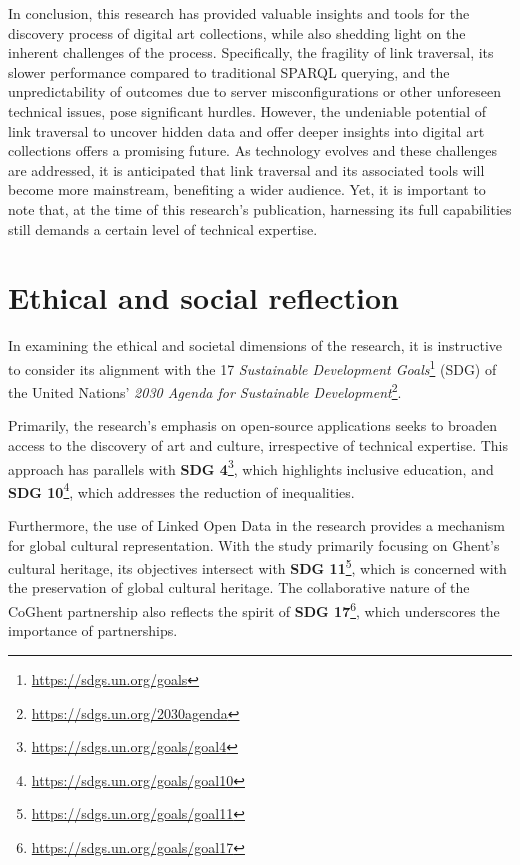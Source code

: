 In conclusion, this research has provided valuable insights and tools for the discovery process of digital art collections, while also shedding light on the inherent challenges of the process. Specifically, the fragility of link traversal, its slower performance compared to traditional SPARQL querying, and the unpredictability of outcomes due to server misconfigurations or other unforeseen technical issues, pose significant hurdles. However, the undeniable potential of link traversal to uncover hidden data and offer deeper insights into digital art collections offers a promising future. As technology evolves and these challenges are addressed, it is anticipated that link traversal and its associated tools will become more mainstream, benefiting a wider audience. Yet, it is important to note that, at the time of this research's publication, harnessing its full capabilities still demands a certain level of technical expertise.

\section*{Ethical and social reflection}

In examining the ethical and societal dimensions of the research, it is instructive to consider its alignment with the 17 \textit{Sustainable Development Goals}\footnote{\url{https://sdgs.un.org/goals}} (SDG) of the United Nations' \textit{2030 Agenda for Sustainable Development}\footnote{\url{https://sdgs.un.org/2030agenda}}.

Primarily, the research's emphasis on open-source applications seeks to broaden access to the discovery of art and culture, irrespective of technical expertise. This approach has parallels with \textbf{SDG 4}\footnote{\url{https://sdgs.un.org/goals/goal4}}, which highlights inclusive education, and \textbf{SDG 10}\footnote{\url{https://sdgs.un.org/goals/goal10}}, which addresses the reduction of inequalities.

Furthermore, the use of Linked Open Data in the research provides a mechanism for global cultural representation. With the study primarily focusing on Ghent's cultural heritage, its objectives intersect with \textbf{SDG 11}\footnote{\url{https://sdgs.un.org/goals/goal11}}, which is concerned with the preservation of global cultural heritage. The collaborative nature of the CoGhent partnership also reflects the spirit of \textbf{SDG 17}\footnote{\url{https://sdgs.un.org/goals/goal17}}, which underscores the importance of partnerships.

